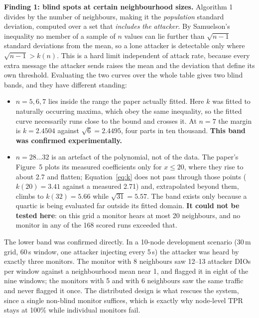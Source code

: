 \documentclass[11pt, a4paper]{article}
\begin{document}
\textbf{Finding 1: blind spots at certain neighbourhood sizes.} Algorithm 1 divides by the number of neighbours, making it the \textit{population} standard deviation, computed over a set that \textit{includes the attacker}. By Samuelson's inequality no member of a sample of $n$ values can lie further than $\sqrt{n-1}$ standard deviations from the mean, so a lone attacker is detectable only where $\sqrt{n-1}>k(n)$. This is a hard limit independent of attack rate, because every extra message the attacker sends raises the mean and the deviation that define its own threshold. Evaluating the two curves over the whole table gives two blind bands, and they have different standing:

\begin{itemize}
  \item $n=5,6,7$ lies inside the range the paper actually fitted. Here $k$ was fitted to naturally occurring maxima, which obey the same inequality, so the fitted curve necessarily runs close to the bound and crosses it. At $n=7$ the margin is $k=2.4504$ against $\sqrt6=2.4495$, four parts in ten thousand. \textbf{This band was confirmed experimentally.}
  \item $n=28\ldots32$ is an artefact of the polynomial, not of the data. The paper's Figure~5 plots its measured coefficients only for $x\le20$, where they rise to about 2.7 and flatten; Equation~\ref{eq:k} does not pass through those points ($k(20)=3.41$ against a measured 2.71) and, extrapolated beyond them, climbs to $k(32)=5.66$ while $\sqrt{31}=5.57$. The band exists only because a quartic is being evaluated far outside its fitted domain. \textbf{It could not be tested here}: on this grid a monitor hears at most 20 neighbours, and no monitor in any of the 168 scored runs exceeded that.
\end{itemize}

The lower band was confirmed directly. In a 10-node development scenario (30\,m grid, 60\,s window, one attacker injecting every 5\,s) the attacker was heard by exactly three monitors. The monitor with 8 neighbours saw 12--13 attacker DIOs per window against a neighbourhood mean near 1, and flagged it in eight of the nine windows; the monitors with 5 and with 6 neighbours saw the same traffic and never flagged it once. The distributed design is what rescues the system, since a single non-blind monitor suffices, which is exactly why node-level TPR stays at 100\% while individual monitors fail.
\end{document}
